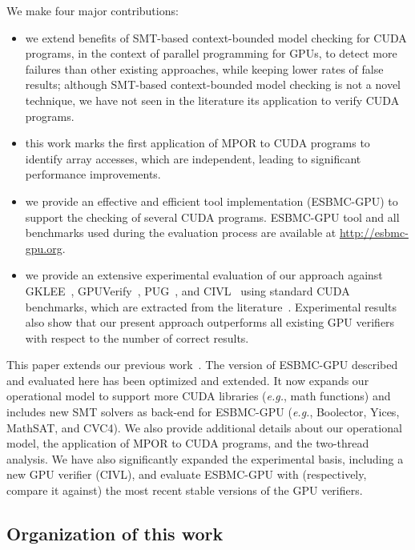 \documentclass[times, doublespace]{cpeauth}
\begin{document}
We make four major contributions:
\vspace{-4pt}
\begin{itemize}
\item we extend benefits of SMT-based context-bounded model checking for CUDA programs, in the context of parallel programming for GPUs, to detect more failures than other existing approaches, while keeping lower rates of false results; although SMT-based context-bounded model checking is not a novel technique, we have not seen in the literature its application to verify CUDA programs.

\item this work marks the first application of MPOR to CUDA programs to identify array accesses, which are independent, leading to significant performance improvements.

\item we provide an effective and efficient tool implementation (ESBMC-GPU) to support the checking of several CUDA programs. ESBMC-GPU tool and all benchmarks used during the evaluation process are available at \url{http://esbmc-gpu.org}.

\item we provide an extensive experimental evaluation of our approach against GKLEE~\cite{Li:2012}, GPUVerify~\cite{betts:2012}, PUG~\cite{Li:2010}, and CIVL~\cite{civl:2015} using standard CUDA benchmarks, which are extracted from the literature~\cite{cuda:2012,betts:2012,cudaproguide:2015}. Experimental results also show that our present approach outperforms all existing GPU verifiers with respect to the number of correct results.
\end{itemize}


This paper extends our previous work~\cite{Pereira15,Pereira16}. The version of ESBMC-GPU described and evaluated here has been optimized and extended. It now expands our operational model to support more CUDA libraries ({\it e.g.}, math functions) and includes new SMT solvers as back-end for ESBMC-GPU ({\it e.g.}, Boolector, Yices, MathSAT, and CVC4). We also provide additional details about our operational model, the application of MPOR to CUDA programs, and the two-thread analysis. We have also significantly expanded the experimental basis, including a new GPU verifier (CIVL), and evaluate ESBMC-GPU with (respectively, compare it against) the most recent stable versions of the GPU verifiers. 

\subsection{Organization of this work}
\vspace{-2pt}
\label{sec:organization}
\end{document}
